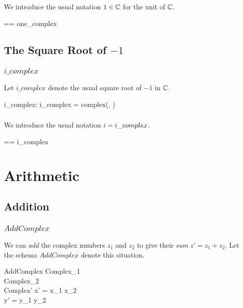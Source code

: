 \documentclass{amsart}
\begin{document}
We introduce the usual notation $1 \in \mathbb{C}$ for the unit of $\mathbb{C}$.

\begin{zed}
	\oneC == one\_complex
\end{zed}

\subsection{The Square Root of $-1$}

\subsubsection{$i\_complex$}

Let $i\_complex$ denote the usual square root of $-1$ in $\mathbb{C}$.

\begin{axdef}
	i\_complex: \C
\where
	i\_complex = complex(\zeroR, \oneR)
\end{axdef}

\subsubsection{}

We introduce the usual notation $i = i\_complex$.

\begin{zed}
	\iC == i\_complex
\end{zed}

\section{Arithmetic}

\subsection{Addition}

\subsubsection{$AddComplex$}

We can \textit{add} the complex numbers $z_1$ and $z_2$ to give their \textit{sum} $z' = z_1 + z_2$.
Let the schema $AddComplex$ denote this situation.

\begin{schema}{AddComplex}
	Complex_1 \\
	Complex_2 \\
	Complex'
\where
	x' = x_1 \addR x_2 \\
	y' = y_1 \addR y_2
\end{schema}
\end{document}
